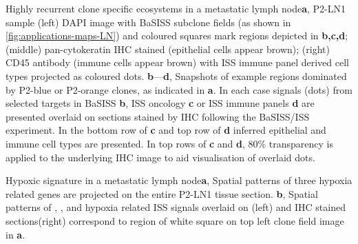     {Highly recurrent clone specific ecosystems in a metastatic lymph node}{\textbf{a}, P2-LN1 sample (left) DAPI image with \ac{BaSISS} subclone fields (as shown in \cref{fig:applications-maps-LN}) and coloured squares mark regions depicted in \textbf{b,c,d}; (middle) pan-cytokeratin \ac{IHC} stained (epithelial cells appear brown); (right) CD45 antibody (immune cells appear brown) with ISS immune panel derived cell types projected as coloured dots. \textbf{b}—\textbf{d}, Snapshots of example regions dominated by P2-blue or P2-orange clones, as indicated in \textbf{a}. In each case signals (dots) from selected targets in BaSISS \textbf{b}, \ac{ISS} oncology \textbf{c} or \ac{ISS} immune panels \textbf{d} are presented overlaid on sections stained by \ac{IHC} following the \ac{BaSISS}/\ac{ISS} experiment. In the bottom row of \textbf{c} and top row of \textbf{d} inferred epithelial and immune cell types are presented. In top rows of \textbf{c} and \textbf{d}, 80\% transparency is applied to the underlying \ac{IHC} image to aid visualisation of overlaid dots.}

    {Hypoxic signature in a metastatic lymph node}{\textbf{a}, Spatial patterns of three hypoxia related genes are projected on the entire P2-LN1 tissue section. \textbf{b}, Spatial patterns of , ,  and hypoxia related \ac{ISS} signals overlaid on  (left) and  \ac{IHC} stained sections(right) correspond to region of white square on top left clone field image in \textbf{a}.}